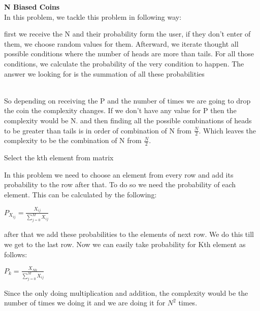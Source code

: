 \documentclass[a4 paper]{article}
\begin{document}

\vspace{5mm}

  \textbf{N Biased Coins}
\vskip 5mm
\solution{}
\\
In this problem, we tackle this problem in following way:

first we receive the N and their probability form the user, if they don't enter of them, we choose random values for them. Afterward, we iterate thought all possible conditions where the number of heads are more than tails. For all those conditions, we calculate the probability of the very condition to happen. The answer we looking for is the summation of all these probabilities
\vspace{5mm}

\complexity
\\


So depending on receiving the P and the number of times we are going to drop the coin the complexity changes. If we don’t have any value for P then the complexity would be N. and then finding all the possible combinations of heads to be greater than tails is in order of combination of N from $\frac{N}{2} $. Which leaves the complexity to be the combination of N from $\frac{N}{2}$.

\vspace{10mm}

  Select the kth element from matrix
\vskip 5mm
\solution{}

In this problem we need to choose an element from every row and add its probability to the row after that. To do so we need the probability of each element. This can be calculated by the following:
\vskip 5mm
\begin{center}
$P_X_{ij} = \frac{X_{ij}}{\sum_{j=0}^{M}X_{ij}}$
\end{center}
after that we add these probabilities to the elements of next row. We do this till we get to the last row. Now we can easily take probability for Kth element as follows:
\vskip 5mm
\begin{center}
$P_k = \frac{X_{Nk}}{\sum_{j=0}^M X_{ij}}$
\end{center}
\complexity


Since the only doing multiplication and addition, the complexity would be the number of times we doing it and we are doing it for $N^2$ times.
\vspace{10mm}
\end{document}
